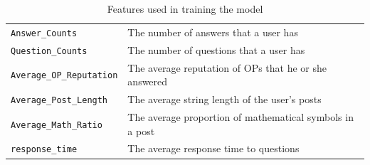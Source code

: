\documentclass[12pt]{article}
\begin{document}
\begin{table}
\centering
\renewcommand{\arraystretch}{1.5}
\begin{tabu} to \textwidth {X[l] X[1.5l]}
\toprule
\lstinline!Answer_Counts!& The number of answers that a user has\\
\lstinline!Question_Counts!& The number of questions that a user has\\
\lstinline!Average_OP_Reputation!& The average reputation of OPs that he or she answered\\
\lstinline!Average_Post_Length!& The average string length of the user's posts\\
\lstinline!Average_Math_Ratio!& The average proportion of mathematical symbols in a post\\
\lstinline!response_time!& The average response time to questions \\
\bottomrule
\end{tabu}
\caption{Features used in training the model}
\label{feature-table}
\end{table}
\end{document}
